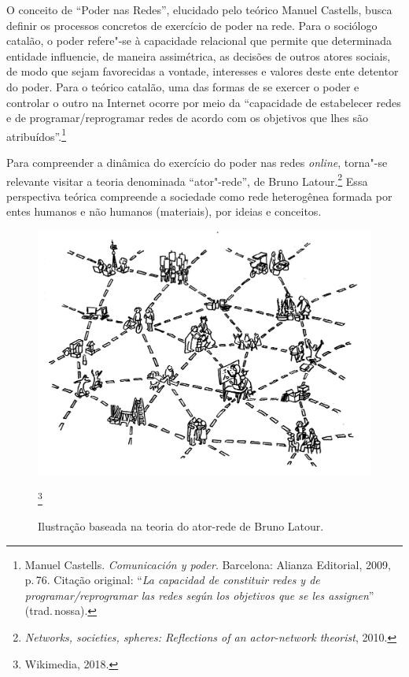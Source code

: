 O conceito de ``Poder nas Redes'', elucidado pelo teórico Manuel
Castells, busca definir os processos concretos de exercício de
poder na rede. Para o sociólogo catalão, o poder refere"-se à capacidade
relacional que permite que determinada entidade influencie, de maneira
assimétrica, as decisões de outros atores sociais, de modo que sejam
favorecidas a vontade, interesses e valores deste ente detentor do
poder. Para o teórico catalão, uma das formas de se exercer o poder e
controlar o outro na Internet ocorre por meio da ``capacidade de
estabelecer redes e de programar/reprogramar redes de acordo com os
objetivos que lhes são atribuídos''.\footnote{Manuel Castells. \emph{Comunicación y poder}. Barcelona: Alianza Editorial, 2009, p.\,76. Citação original: ``\emph{La capacidad de constituir redes y de programar/reprogramar las redes según los objetivos que se les
  assignen}'' (trad.\,nossa).}

Para compreender a dinâmica do exercício do poder nas redes \emph{online},
torna"-se relevante visitar a teoria denominada ``ator"-rede'', de Bruno
Latour.\footnote{\emph{Networks, societies, spheres: Reflections of an
actor-network theorist}, 2010.} Essa perspectiva teórica compreende a sociedade como rede
heterogênea formada por entes humanos e não humanos (materiais), por
ideias e conceitos.


\begin{figure}[!ht]
\includegraphics[width=\textwidth]{./imgs/grafico4.jpg}
\caption{\formular\footnotesize{Ilustração baseada na teoria do ator-rede de Bruno Latour.}}\footnote{Wikimedia, 2018.}
\end{figure}

